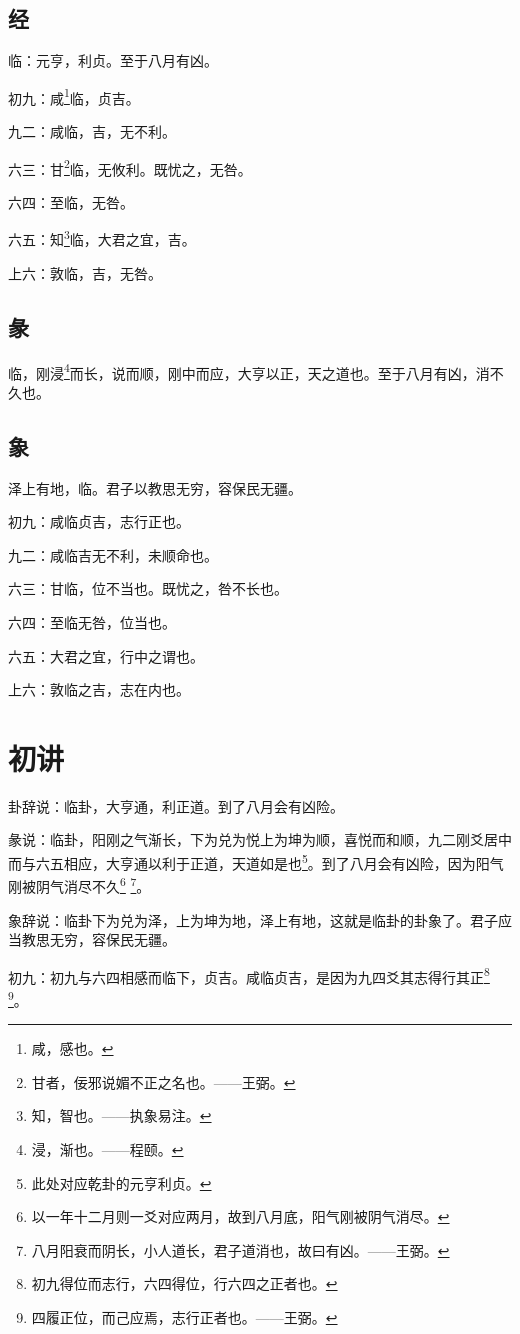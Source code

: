 \documentclass[12pt,oneside]{book}
\begin{document}
\subsection{经}
临：元亨，利贞。至于八月有凶。

初九：咸\footnote{咸，感也。}临，贞吉。

九二：咸临，吉，无不利。

六三：甘\footnote{甘者，佞邪说媚不正之名也。——王弼。}临，无攸利。既忧之，无咎。

六四：至临，无咎。

六五：知\footnote{知，智也。——执象易注。}临，大君之宜，吉。

上六：敦临，吉，无咎。

\subsection{彖}
临，刚浸\footnote{浸，渐也。——程颐。}而长，说而顺，刚中而应，大亨以正，天之道也。至于八月有凶，消不久也。

\subsection{象}
泽上有地，临。君子以教思无穷，容保民无疆。

初九：咸临贞吉，志行正也。

九二：咸临吉无不利，未顺命也。

六三：甘临，位不当也。既忧之，咎不长也。

六四：至临无咎，位当也。

六五：大君之宜，行中之谓也。

上六：敦临之吉，志在内也。

\section{初讲}
卦辞说：临卦，大亨通，利正道。到了八月会有凶险。

彖说：临卦，阳刚之气渐长，下为兑为悦上为坤为顺，喜悦而和顺，九二刚爻居中而与六五相应，大亨通以利于正道，天道如是也\footnote{此处对应乾卦的元亨利贞。}。到了八月会有凶险，因为阳气刚被阴气消尽不久\footnote{以一年十二月则一爻对应两月，故到八月底，阳气刚被阴气消尽。} \footnote{八月阳衰而阴长，小人道长，君子道消也，故曰有凶。——王弼。}。

象辞说：临卦下为兑为泽，上为坤为地，泽上有地，这就是临卦的卦象了。君子应当教思无穷，容保民无疆。

初九：初九与六四相感而临下，贞吉。咸临贞吉，是因为九四爻其志得行其正\footnote{初九得位而志行，六四得位，行六四之正者也。} \footnote{四履正位，而己应焉，志行正者也。——王弼。}。
\end{document}
